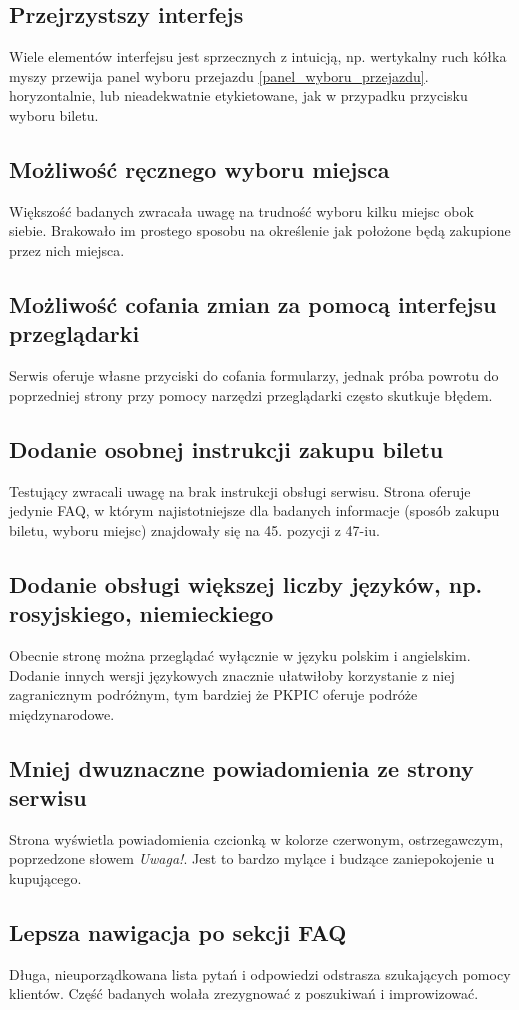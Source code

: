 \documentclass{article}
\begin{document}
\subsection{Przejrzystszy interfejs}
Wiele elementów interfejsu jest sprzecznych z intuicją, np. wertykalny ruch kółka myszy przewija panel wyboru przejazdu \ref{panel_wyboru_przejazdu}. horyzontalnie, lub nieadekwatnie etykietowane, jak w przypadku przycisku wyboru biletu.
\subsection{Możliwość ręcznego wyboru miejsca}
Większość badanych zwracała uwagę na trudność wyboru kilku miejsc obok siebie. Brakowało im prostego sposobu na określenie jak położone będą zakupione przez nich miejsca.
\subsection{Możliwość cofania zmian za pomocą interfejsu przeglądarki}
Serwis oferuje własne przyciski do cofania formularzy, jednak próba powrotu do poprzedniej strony przy pomocy narzędzi przeglądarki często skutkuje błędem.
\subsection{Dodanie osobnej instrukcji zakupu biletu}
Testujący zwracali uwagę na brak instrukcji obsługi serwisu. Strona oferuje jedynie FAQ, w którym najistotniejsze dla badanych informacje (sposób zakupu biletu, wyboru miejsc) znajdowały się na 45. pozycji z 47-iu.
\subsection{Dodanie obsługi większej liczby języków, np. rosyjskiego, niemieckiego}
Obecnie stronę można przeglądać wyłącznie w języku polskim i angielskim. Dodanie innych wersji językowych znacznie ułatwiłoby korzystanie z niej zagranicznym podróżnym, tym bardziej że PKPIC oferuje podróże międzynarodowe.
\subsection{Mniej dwuznaczne powiadomienia ze strony serwisu}
Strona wyświetla powiadomienia czcionką w kolorze czerwonym, ostrzegawczym, poprzedzone słowem \emph{Uwaga!}. Jest to bardzo mylące i budzące zaniepokojenie u kupującego.
\subsection{Lepsza nawigacja po sekcji FAQ}
Długa, nieuporządkowana lista pytań i odpowiedzi odstrasza szukających pomocy klientów. Część badanych wolała zrezygnować z poszukiwań i improwizować.
\end{document}
